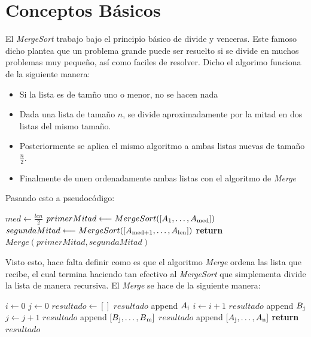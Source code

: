 \documentclass[12pt,twoside]{article}
\begin{document}
\section{Conceptos B\'asicos}
El \textit{MergeSort} trabajo bajo el principio b\'asico de divide y venceras. Este famoso dicho plantea que un problema grande puede ser resuelto si se divide en muchos problemas muy pequeño, as\'i como faciles de resolver. Dicho el algorimo funciona de la siguiente manera:
\begin{itemize}
    \item Si la lista es de tamño uno o menor, no se hacen nada
    \item Dada una lista de tamaño $n$, se divide aproximadamente por la mitad en dos listas del mismo tamaño.
    \item Posteriormente se aplica el mismo algoritmo a ambas listas nuevas de tamaño $\frac{n}{2}$.
    \item Finalmente de unen ordenadamente ambas listas con el algoritmo de \textit{Merge}
\end{itemize}
Pasando esto a pseudoc\'odigo:
\begin{center}
    \begin{algorithmic}[1]
                \State $med \longleftarrow \frac{len}{2}$
                \State $primerMitad \longleftarrow MergeSort([A\textsubscript{1}, \dots, A\textsubscript{med}])$
                \State $segundaMitad \longleftarrow MergeSort([A\textsubscript{med+1}, \dots, A\textsubscript{len}])$
                \State \textbf{return} $Merge(primerMitad, segundaMitad)$
            \EndIf
        \EndProcedure
    \end{algorithmic}
\end{center}
Visto esto, hace falta definir como es que el algoritmo \textit{Merge} ordena las lista que recibe, el cual termina haciendo tan efectivo al \textit{MergeSort} que simplementa divide la lista de manera recursiva. El \textit{Merge} se hace de la siguiente manera: 
\begin{center}
    \begin{algorithmic}[1]
            \State $i \longleftarrow 0$
            \State $j \longleftarrow 0$
            \State $resultado \longleftarrow []$
                    \State $resultado$ append $A\textsubscript{i}$
                    \State $i \longleftarrow i + 1$
                \Else
                    \State $resultado$ append $B\textsubscript{j}$
                    \State $j \longleftarrow j + 1$
                \EndIf
            \EndWhile
                \State $resultado$ append $[B\textsubscript{j}, \dots, B\textsubscript{m}]$
            \Else
                \State $resultado$ append $[A\textsubscript{j}, \dots, A\textsubscript{n}]$
            \EndIf
            \State \textbf{return} $resultado$
        \EndProcedure
    \end{algorithmic}
\end{center}
\end{document}
